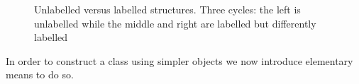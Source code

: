 \begin{figure}
    \begin{subfigure}[b]{0.30\textwidth}
        \centering
        \resizebox{\linewidth}{!} {
             
        }
    \end{subfigure}
    \begin{subfigure}[b]{0.30\textwidth}
        \centering
        \resizebox{\linewidth}{!} {
             
        }
    \end{subfigure}
    \begin{subfigure}[b]{0.30\textwidth}
        \centering
        \resizebox{\linewidth}{!} {
             
        }
    \end{subfigure}
    \caption{Unlabelled versus labelled structures. Three cycles: the left is unlabelled while the middle and right are labelled but differently labelled}
    \label{fig:unlabelled labelled}
 \end{figure}

In order to construct a class using simpler objects we now introduce elementary means to do so.


